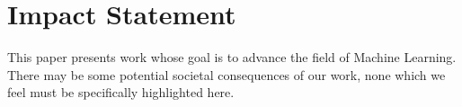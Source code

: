 \documentclass{article}
\theoremstyle{plain}
\theoremstyle{definition}
\theoremstyle{remark}
\begin{document}
 



\clearpage

\section*{Impact Statement}
This paper presents work whose goal is to advance the field of 
Machine Learning. There may be some potential societal consequences 
of our work, none which we feel must be specifically highlighted here.






\newpage
\appendix
\onecolumn
\end{document}
